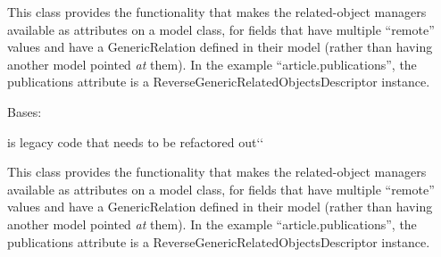 \documentclass[letterpaper,10pt,english]{sphinxmanual}
\begin{document}
\begin{fulllineitems}
\begin{fulllineitems}
\end{fulllineitems}



\begin{fulllineitems}
\label{generated/apps.profiles.models:apps.profiles.models.BaseModel.unit_permissions}
This class provides the functionality that makes the related-object
managers available as attributes on a model class, for fields that have
multiple ``remote'' values and have a GenericRelation defined in their model
(rather than having another model pointed \emph{at} them). In the example
``article.publications'', the publications attribute is a
ReverseGenericRelatedObjectsDescriptor instance.

\end{fulllineitems}


\end{fulllineitems}



\begin{fulllineitems}
\label{generated/apps.profiles.models:apps.profiles.models.ContactEmail}
Bases: {\hyperref[generated/apps.profiles.models:apps.profiles.models.BaseModel]{}}

 is legacy code that needs to be refactored out{}`{}`


\begin{fulllineitems}
\label{generated/apps.profiles.models:apps.profiles.models.ContactEmail.unit_permissions}
This class provides the functionality that makes the related-object
managers available as attributes on a model class, for fields that have
multiple ``remote'' values and have a GenericRelation defined in their model
(rather than having another model pointed \emph{at} them). In the example
``article.publications'', the publications attribute is a
ReverseGenericRelatedObjectsDescriptor instance.

\end{fulllineitems}


\end{fulllineitems}
\end{document}
